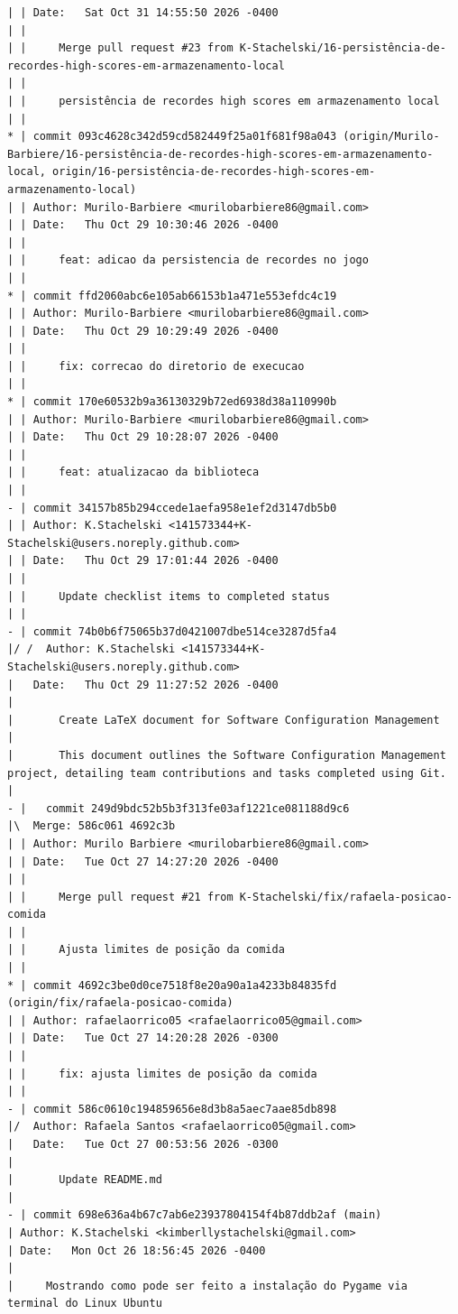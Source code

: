 \documentclass[12pt]{article}
\begin{document}
\begin{lstlisting}
| | Date:   Sat Oct 31 14:55:50 2026 -0400
| | 
| |     Merge pull request #23 from K-Stachelski/16-persistência-de-recordes-high-scores-em-armazenamento-local
| |     
| |     persistência de recordes high scores em armazenamento local
| | 
* | commit 093c4628c342d59cd582449f25a01f681f98a043 (origin/Murilo-Barbiere/16-persistência-de-recordes-high-scores-em-armazenamento-local, origin/16-persistência-de-recordes-high-scores-em-armazenamento-local)
| | Author: Murilo-Barbiere <murilobarbiere86@gmail.com>
| | Date:   Thu Oct 29 10:30:46 2026 -0400
| | 
| |     feat: adicao da persistencia de recordes no jogo
| | 
* | commit ffd2060abc6e105ab66153b1a471e553efdc4c19
| | Author: Murilo-Barbiere <murilobarbiere86@gmail.com>
| | Date:   Thu Oct 29 10:29:49 2026 -0400
| | 
| |     fix: correcao do diretorio de execucao
| | 
* | commit 170e60532b9a36130329b72ed6938d38a110990b
| | Author: Murilo-Barbiere <murilobarbiere86@gmail.com>
| | Date:   Thu Oct 29 10:28:07 2026 -0400
| | 
| |     feat: atualizacao da biblioteca
| | 
- | commit 34157b85b294ccede1aefa958e1ef2d3147db5b0
| | Author: K.Stachelski <141573344+K-Stachelski@users.noreply.github.com>
| | Date:   Thu Oct 29 17:01:44 2026 -0400
| | 
| |     Update checklist items to completed status
| | 
- | commit 74b0b6f75065b37d0421007dbe514ce3287d5fa4
|/ /  Author: K.Stachelski <141573344+K-Stachelski@users.noreply.github.com>
|   Date:   Thu Oct 29 11:27:52 2026 -0400
|   
|       Create LaTeX document for Software Configuration Management
|       
|       This document outlines the Software Configuration Management project, detailing team contributions and tasks completed using Git.
|   
- |   commit 249d9bdc52b5b3f313fe03af1221ce081188d9c6
|\  Merge: 586c061 4692c3b
| | Author: Murilo Barbiere <murilobarbiere86@gmail.com>
| | Date:   Tue Oct 27 14:27:20 2026 -0400
| | 
| |     Merge pull request #21 from K-Stachelski/fix/rafaela-posicao-comida
| |     
| |     Ajusta limites de posição da comida
| | 
* | commit 4692c3be0d0ce7518f8e20a90a1a4233b84835fd (origin/fix/rafaela-posicao-comida)
| | Author: rafaelaorrico05 <rafaelaorrico05@gmail.com>
| | Date:   Tue Oct 27 14:20:28 2026 -0300
| | 
| |     fix: ajusta limites de posição da comida
| | 
- | commit 586c0610c194859656e8d3b8a5aec7aae85db898
|/  Author: Rafaela Santos <rafaelaorrico05@gmail.com>
|   Date:   Tue Oct 27 00:53:56 2026 -0300
|   
|       Update README.md
|   
- | commit 698e636a4b67c7ab6e23937804154f4b87ddb2af (main)
| Author: K.Stachelski <kimberllystachelski@gmail.com>
| Date:   Mon Oct 26 18:56:45 2026 -0400
| 
|     Mostrando como pode ser feito a instalação do Pygame via terminal do Linux Ubuntu

\end{lstlisting}
\end{document}
